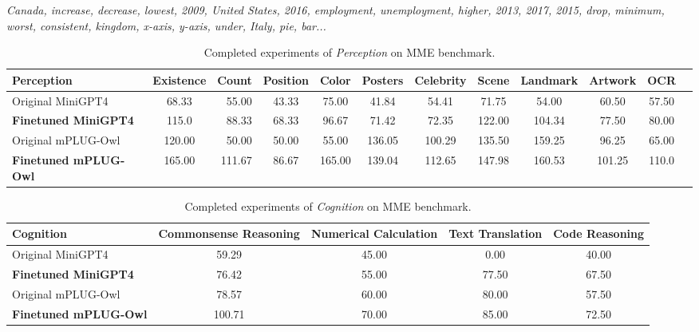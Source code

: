 \textit{Canada, increase, decrease, lowest, 2009, United States, 2016, employment, unemployment, higher, 2013, 2017, 2015, drop, minimum, worst, consistent, kingdom, x-axis, y-axis, under, Italy, pie, bar...}



\begin{table}[t]
\setlength\tabcolsep{1pt}
\centering
\small
\begin{tabular}{lcrccccccccc}
\toprule[1.5pt]
Perception& Existence&Count & Position & Color & Posters & Celebrity& Scene & Landmark & Artwork & OCR\\
\midrule
Original MiniGPT4 & 68.33&55.00&43.33&75.00&41.84&54.41&71.75&54.00&60.50&57.50\\
\textbf{Finetuned MiniGPT4} & 115.0&88.33&68.33&96.67&71.42&72.35&122.00&104.34&77.50&80.00&\\
Original mPLUG-Owl & 120.00&50.00&50.00&55.00&136.05&100.29&135.50&159.25&96.25&65.00\\
\textbf{Finetuned mPLUG-Owl} & 165.00&111.67&86.67&165.00&139.04&112.65&147.98&160.53&101.25& 110.0\\
\midrule
\end{tabular}
\vspace{-2mm}
\caption{Completed experiments of \textit{Perception} on MME \cite{fu2023mme} benchmark. }
\label{tab:mme_preception}
\vspace{-0.1in}
\end{table}

\begin{table}[t]
\setlength\tabcolsep{3pt}
\centering
\small
\begin{tabular}{lcccc}
\toprule[1.5pt]
Cognition &Commonsense Reasoning& Numerical Calculation&Text Translation & Code Reasoning\\
\midrule
Original MiniGPT4 & 59.29&45.00&0.00&40.00\\
\textbf{Finetuned MiniGPT4} & 76.42&55.00&77.50&67.50\\
Original mPLUG-Owl & 78.57&60.00&80.00&57.50\\
\textbf{Finetuned mPLUG-Owl} & 100.71&70.00&85.00&72.50\\
\midrule
\end{tabular}
\vspace{-2mm}
\caption{Completed experiments of \textit{Cognition} on MME \cite{fu2023mme} benchmark. }
\label{tab:mme_cog}
\vspace{-0.1in}
\end{table}

